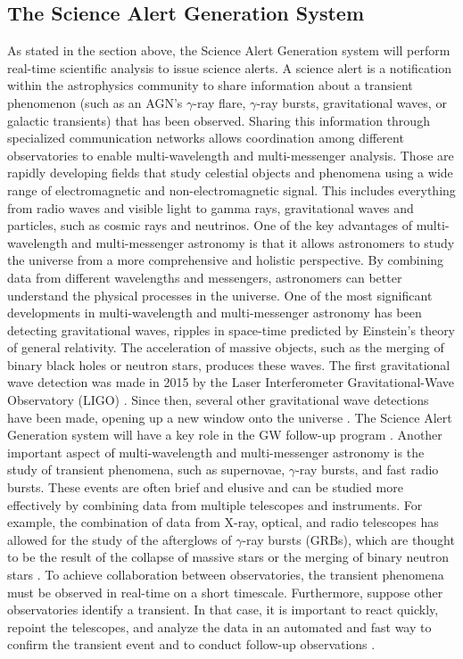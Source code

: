 \subsection{The Science Alert Generation System}
\label{s:sag}
As stated in the section above, the Science Alert Generation system will perform real-time scientific analysis to issue science alerts. A science alert is a notification within the astrophysics community to share information about a transient phenomenon (such as an AGN's $\gamma$-ray flare, $\gamma$-ray bursts, gravitational waves, or galactic transients) that has been observed. Sharing this information through specialized communication networks allows coordination among different observatories to enable multi-wavelength and multi-messenger analysis. Those are rapidly developing fields that study celestial objects and phenomena using a wide range of electromagnetic and non-electromagnetic signal. This includes everything from radio waves and visible light to gamma rays, gravitational waves and particles, such as cosmic rays and neutrinos. One of the key advantages of multi-wavelength and multi-messenger astronomy is that it allows astronomers to study the universe from a more comprehensive and holistic perspective. By combining data from different wavelengths and messengers, astronomers can better understand the physical processes in the universe. One of the most significant developments in multi-wavelength and multi-messenger astronomy has been detecting gravitational waves, ripples in space-time predicted by Einstein's theory of general relativity. The acceleration of massive objects, such as the merging of binary black holes or neutron stars, produces these waves. The first gravitational wave detection was made in 2015 by the Laser Interferometer Gravitational-Wave Observatory (LIGO) \cite{gw_061102}. Since then, several other gravitational wave detections have been made, opening up a new window onto the universe \cite{abbott2016observation}. The Science Alert Generation system will have a key role in the GW follow-up program \cite{seglar2019gravitational}. Another important aspect of multi-wavelength and multi-messenger astronomy is the study of transient phenomena, such as supernovae, $\gamma$-ray bursts, and fast radio bursts. These events are often brief and elusive and can be studied more effectively by combining data from multiple telescopes and instruments. For example, the combination of data from X-ray, optical, and radio telescopes has allowed for the study of the afterglows of $\gamma$-ray bursts (GRBs), which are thought to be the result of the collapse of massive stars or the merging of binary neutron stars \cite{Fishman1995}.
To achieve collaboration between observatories, the transient phenomena must be observed in real-time on a short timescale. Furthermore, suppose other observatories identify a transient. In that case, it is important to react quickly, repoint the telescopes, and analyze the data in an automated and fast way to confirm the transient event and to conduct follow-up observations \cite{Bulgarelli_2021}. 
